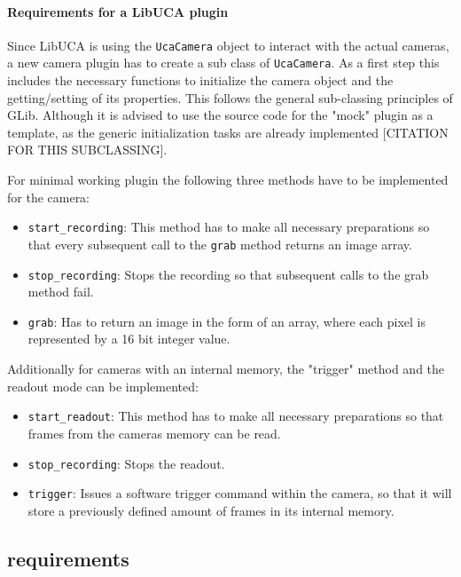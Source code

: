 \paragraph{Requirements for a LibUCA plugin}
Since LibUCA is using the \texttt{UcaCamera} object to interact with the actual cameras, a new camera plugin has to create a sub class of \texttt{UcaCamera}. As a first step this includes the necessary functions to initialize the camera object and the getting/setting of its properties. This follows the general sub-classing principles of GLib. Although it is advised to use the source code for the "mock" plugin as a template, as the generic initialization tasks are already implemented [CITATION FOR THIS SUBCLASSING].\par 
For minimal working plugin the following three methods have to be implemented for the camera:
\begin{itemize}
\item \texttt{start\_recording}: This method has to make all necessary preparations so that every subsequent call to the \texttt{grab} method returns an image array.

\item \texttt{stop\_recording}: Stops the recording so that subsequent calls to the grab method fail.

\item \texttt{grab}: Has to return an image in the form of an array, where each pixel is represented by a 16 bit integer value.
\end{itemize}
Additionally for cameras with an internal memory, the "trigger" method and the readout mode can be implemented:
\begin{itemize}
\item \texttt{start\_readout}: This method has to make all necessary preparations so that frames from the cameras memory can be read.

\item \texttt{stop\_recording}: Stops the readout.

\item \texttt{trigger}: Issues a software trigger command within the camera, so that it will store a previously defined amount of frames in its internal memory.
\end{itemize}

\subsection{requirements}


